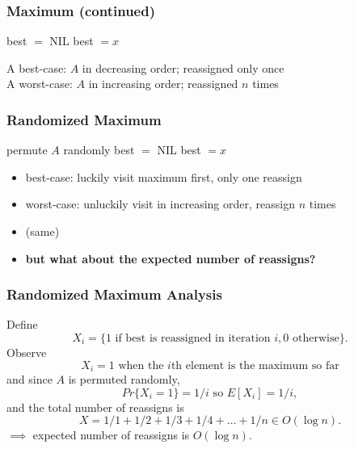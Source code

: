 \documentclass[10pt]{beamer}
\begin{document}
\begin{frame} \frametitle{Maximum (continued)}
  {\footnotesize
  \begin{algorithmic}[1]
    \State best $ = $ NIL
        \State best $= x$
      \EndIf
    \EndFor
    \State {}
    \EndFunction
  \end{algorithmic}
  }
\vspace{.5cm}
A best-case: $A$ in decreasing order; reassigned only once \\
\vspace{.5cm}
A worst-case: $A$ in increasing order; reassigned $n$ times
\end{frame}

\begin{frame} \frametitle{Randomized Maximum}
  {\footnotesize
  \begin{algorithmic}[1]
    \State permute $A$ randomly 
    \State best $ = $ NIL
        \State best $= x$
      \EndIf
    \EndFor
    \State {}
    \EndFunction
  \end{algorithmic}
  }
  \begin{itemize}
    \item best-case: luckily visit maximum first, only one reassign
    \item worst-case: unluckily visit in increasing order, reassign $n$ times
    \item (same)
    \item \textbf{but what about the expected number of reassigns?}
  \end{itemize}
\end{frame}

\begin{frame} \frametitle{Randomized Maximum Analysis}
Define
\[ X_i = \{\text{1 if best is reassigned in iteration } i, 0 \text{ otherwise} \} .\]
Observe
\[ X_i = 1 \text{ when the } i\text{th element is the maximum so far} \]
and since $A$ is permuted randomly,
\[ Pr\{X_i=1\} = 1/i \text{ so } E[X_i] = 1/i, \]
and the total number of reassigns is
\[ X = 1/1 + 1/2 + 1/3 + 1/4 + \ldots + 1/n \in O(\log n). \]
$\implies$ expected number of reassigns is $O(\log n).$
\end{frame}

\end{document}
